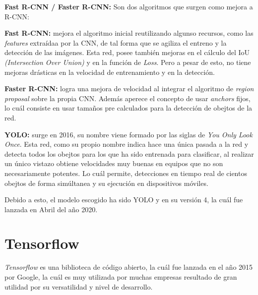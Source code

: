 \begin{list}{\textbullet}{ %
    \addtolength{\itemsep}{-2mm} %
    \setlength{\itemindent}{2mm}}

    \item \textbf{Fast R-CNN / Faster R-CNN:} Son dos algoritmos que surgen como mejora a R-CNN\cite{faster_rcnn}:
    \begin{list}{\textbullet}{ %
        \addtolength{\itemsep}{-2mm} %
        \setlength{\itemindent}{2mm}}
        \item \textbf{Fast R-CNN:} mejora el algoritmo inicial reutilizando algunso recursos, como las \textit{features} extraídaa por la CNN, de tal forma que se agiliza el entreno y la detección de las imágenes.
        Esta red, posee también mejoras en el cálculo del IoU \textit{(Intersection Over Union)} y en la función de \textit{Loss}. Pero a pesar de esto, no tiene mejoras drásticas en la velocidad de entrenamiento y en la detección.
        \clearpage
       \item \textbf{Faster R-CNN:} logra una mejora de velocidad al integrar el algoritmo de \textit{region proposal}\cite{region_proposal} sobre la propia CNN.
       Además aperece el concepto de usar \textit{anchors} fijos, lo cuál consiste en usar tamaños pre calculados para la detección de obejtos de la red.
    \end{list}

    \item \textbf{YOLO:} surge en 2016, su nombre viene formado por las siglas de \textit{You Only Look Once}\cite{yolov4}.
    Esta red, como su propio nombre indica hace una única pasada a la red y detecta todos los obejtos para los que ha sido entrenada para clasificar, al realizar un único vistazo obtiene velocidades muy buenas en equipos que no son necesariamente potentes. Lo cuál permite, detecciones en tiempo real de cientos obejtos de forma simúltanea y su ejecución en dispositivos móviles.  
\end{list}
Debido a esto, el modelo escogido ha sido YOLO y en su versión 4, la cuál fue lanzada en Abril del año 2020.


\section{Tensorflow}
\textit{Tensorflow}\cite{tensorflow} es una biblioteca de código abierto, la cuál fue lanzada en el año 2015 por Google, la cuál es muy utilizada por muchas empresas resultado de gran utilidad por su versatilidad y nivel de desarrollo.

